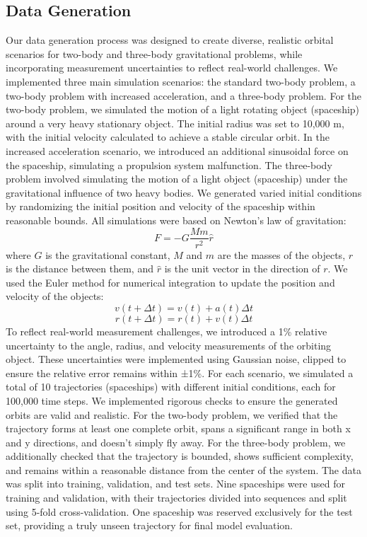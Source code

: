\documentclass[11pt,a4paper, twocolumn]{article}
\begin{document}
\subsection{Data Generation}
Our data generation process was designed to create diverse, realistic orbital scenarios for two-body and three-body gravitational problems, while incorporating measurement uncertainties to reflect real-world challenges. We implemented three main simulation scenarios: the standard two-body problem, a two-body problem with increased acceleration, and a three-body problem.
For the two-body problem, we simulated the motion of a light rotating object (spaceship) around a very heavy stationary object. The initial radius was set to 10,000 m, with the initial velocity calculated to achieve a stable circular orbit. In the increased acceleration scenario, we introduced an additional sinusoidal force on the spaceship, simulating a propulsion system malfunction.
The three-body problem involved simulating the motion of a light object (spaceship) under the gravitational influence of two heavy bodies. We generated varied initial conditions by randomizing the initial position and velocity of the spaceship within reasonable bounds.
All simulations were based on Newton's law of gravitation:
$$F = -G \frac{M m}{r^2} \hat{r}$$
where $G$ is the gravitational constant, $M$ and $m$ are the masses of the objects, $r$ is the distance between them, and $\hat{r}$ is the unit vector in the direction of $r$.
We used the Euler method for numerical integration to update the position and velocity of the objects:
\[v(t + \Delta t) = v(t) + a(t) \Delta t\]
\[r(t + \Delta t) = r(t) + v(t)\Delta t\]
To reflect real-world measurement challenges, we introduced a 1\% relative uncertainty to the angle, radius, and velocity measurements of the orbiting object. These uncertainties were implemented using Gaussian noise, clipped to ensure the relative error remains within ±1\%.
For each scenario, we simulated a total of 10 trajectories (spaceships) with different initial conditions, each for 100,000 time steps. We implemented rigorous checks to ensure the generated orbits are valid and realistic. For the two-body problem, we verified that the trajectory forms at least one complete orbit, spans a significant range in both x and y directions, and doesn't simply fly away. For the three-body problem, we additionally checked that the trajectory is bounded, shows sufficient complexity, and remains within a reasonable distance from the center of the system.
The data was split into training, validation, and test sets. Nine spaceships were used for training and validation, with their trajectories divided into sequences and split using 5-fold cross-validation. One spaceship was reserved exclusively for the test set, providing a truly unseen trajectory for final model evaluation.
\end{document}
